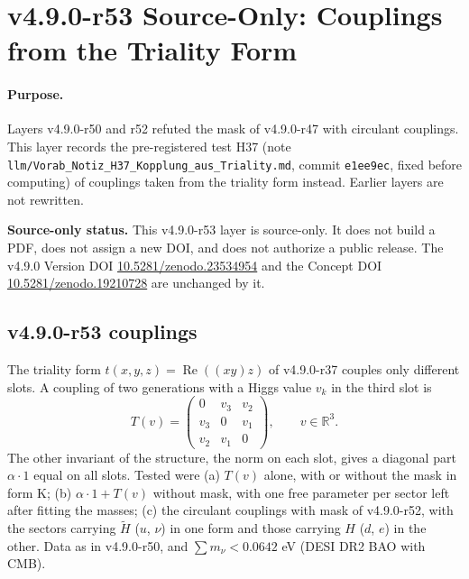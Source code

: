 \clearpage
\section*{v4.9.0-r53 Source-Only: Couplings from the Triality Form}
\label{sec:v490-r53-triality-couplings}

\paragraph{Purpose.}
Layers v4.9.0-r50 and r52 refuted the mask of v4.9.0-r47 with circulant couplings.  This layer records the pre-registered test H37 (note
\texttt{llm/Vorab\_Notiz\_H37\_Kopplung\_aus\_Triality.md}, commit \texttt{e1ee9ec}, fixed before computing) of couplings taken from the triality form
instead.  Earlier layers are not rewritten.

\noindent\textbf{Source-only status.}
This v4.9.0-r53 layer is source-only.  It does not build a PDF, does not assign a new DOI,
and does not authorize a public release.  The v4.9.0 Version DOI
\href{https://doi.org/10.5281/zenodo.23534954}{10.5281/zenodo.23534954} and the Concept DOI
\href{https://doi.org/10.5281/zenodo.19210728}{10.5281/zenodo.19210728} are unchanged by it.

\subsection*{v4.9.0-r53 couplings}
\label{subsec:v490-r53-couplings}

The triality form \(t(x,y,z)=\operatorname{Re}((xy)z)\) of v4.9.0-r37 couples only different slots.  A coupling of two generations with a Higgs value
\(v_k\) in the third slot is
\[
T(v)=\begin{pmatrix}0&v_3&v_2\\v_3&0&v_1\\v_2&v_1&0\end{pmatrix},\qquad v\in\mathbb R^3 .
\]
The other invariant of the structure, the norm on each slot, gives a diagonal part \(\alpha\cdot1\) equal on all slots.  Tested were (a) \(T(v)\)
alone, with or without the mask in form K; (b) \(\alpha\cdot1+T(v)\) without mask, with one free parameter per sector left after fitting the
masses; (c) the circulant couplings with mask of v4.9.0-r52, with the sectors carrying \(\tilde H\) (\(u\), \(\nu\)) in one form and those
carrying \(H\) (\(d\), \(e\)) in the other.  Data as in v4.9.0-r50, and \(\sum m_\nu<0.0642\) eV (DESI DR2 BAO with CMB).

